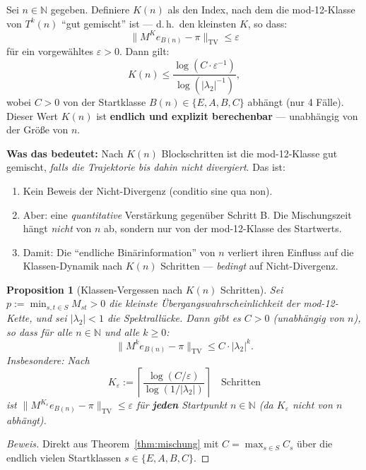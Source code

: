 \documentclass[12pt,a4paper]{article}
\newtheorem{proposition}[definition]{Proposition}
\newenvironment{beweis}{\begin{proof}[Beweis]}{\end{proof}}
\newcommand{\N}{\mathbb{N}}
\newcommand{\TV}{\mathrm{TV}}
\begin{document}
\begin{tcolorbox}[kernidee, title={Das bedingte Informations-Argument (korrekt)}]
Sei $n \in \N$ gegeben. Definiere $K(n)$ als den Index, nach dem die
mod-12-Klasse von $T^k(n)$ ``gut gemischt'' ist --- d.\,h.\ den kleinsten
$K$, so dass:
\[
  \bigl\|M^K e_{B(n)} - \pi\bigr\|_{\TV} \leq \varepsilon
\]
für ein vorgewähltes $\varepsilon > 0$. Dann gilt:
\[
  K(n) \leq \frac{\log(C \cdot \varepsilon^{-1})}{\log(|\lambda_2|^{-1})},
\]
wobei $C > 0$ von der Startklasse $B(n) \in \{E,A,B,C\}$ abhängt (nur 4 Fälle).
Dieser Wert $K(n)$ ist \textbf{endlich und explizit berechenbar} --- unabhängig
von der Größe von $n$.

\medskip
\textbf{Was das bedeutet:} Nach $K(n)$ Blockschritten ist die mod-12-Klasse
gut gemischt, \emph{falls die Trajektorie bis dahin nicht divergiert}. Das ist:
\begin{enumerate}[label=(\alph*), nosep]
  \item Kein Beweis der Nicht-Divergenz (conditio sine qua non).
  \item Aber: eine \emph{quantitative} Verstärkung gegenüber Schritt B.
    Die Mischungszeit hängt \emph{nicht} von $n$ ab, sondern nur von der
    mod-12-Klasse des Startwerts.
  \item Damit: Die ``endliche Binärinformation'' von $n$ verliert ihren
    Einfluss auf die Klassen-Dynamik nach $K(n)$ Schritten --- \emph{bedingt}
    auf Nicht-Divergenz.
\end{enumerate}
\end{tcolorbox}

\begin{proposition}[Klassen-Vergessen nach $K(n)$ Schritten]
\label{prop:vergessen}
Sei $p := \min_{s,t \in S} M_{st} > 0$ die kleinste Übergangswahrscheinlichkeit
der mod-12-Kette, und sei $|\lambda_2| < 1$ die Spektrallücke. Dann gibt es
$C > 0$ (unabhängig von $n$), so dass für alle $n \in \N$ und alle $k \geq 0$:
\[
  \bigl\|M^k e_{B(n)} - \pi\bigr\|_{\TV} \leq C \cdot |\lambda_2|^k.
\]
Insbesondere: Nach
\[
  K_\varepsilon := \left\lceil\frac{\log(C/\varepsilon)}{\log(1/|\lambda_2|)}\right\rceil
  \quad \text{Schritten}
\]
ist $\|M^{K_\varepsilon} e_{B(n)} - \pi\|_{\TV} \leq \varepsilon$
für \textbf{jeden} Startpunkt $n \in \N$ (da $K_\varepsilon$ nicht von $n$ abhängt).
\end{proposition}

\begin{beweis}
Direkt aus Theorem~\ref{thm:mischung} mit $C = \max_{s \in S} C_s$ über
die endlich vielen Startklassen $s \in \{E, A, B, C\}$.
\end{beweis}
\end{document}
